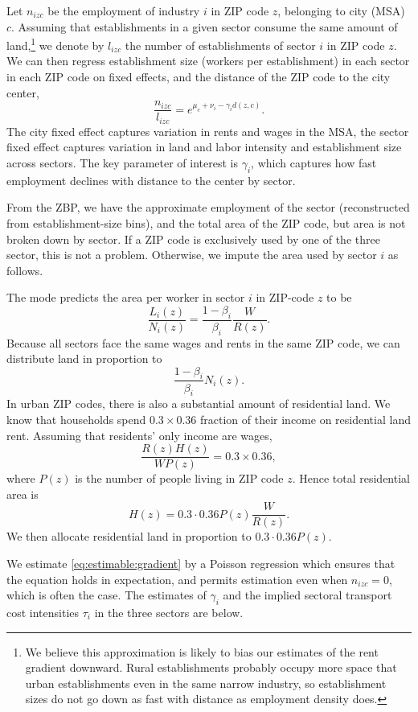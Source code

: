 \documentclass[12pt]{article}
\begin{document}
Let $n_{izc}$ be the employment of industry $i$ in ZIP code $z$, belonging to city (MSA) $c$.  Assuming that establishments in a given sector consume the same amount of land,\footnote{We believe this approximation is likely to bias our estimates of the rent gradient downward. Rural establishments probably occupy more space that urban establishments even in the same narrow industry, so establishment sizes do not go down as fast with distance as employment density does. } we denote by $l_{izc}$ the number of establishments of sector $i$ in ZIP code $z$. We can then regress establishment size (workers per establishment) in each sector in each ZIP code on fixed effects, and the distance of the ZIP code to the city center,
\begin{equation}\label{eq:estimable:gradient}
\frac{n_{izc}}{l_{izc}} = e^{\mu_c+\nu_i-\gamma_i d(z,c)}.
\end{equation}
The city fixed effect captures variation in rents and wages in the MSA, the sector fixed effect captures variation in land and labor intensity and establishment size across sectors. %
The key parameter of interest is $\gamma_i$, which captures how fast employment declines with distance to the center by sector.

From the ZBP, we have the approximate employment of the sector (reconstructed from establishment-size bins), and the total area of the ZIP code, but area is not broken down by sector. If a ZIP code is exclusively used by one of the three sector, this is not a problem. Otherwise, we impute the area used by sector $i$ as follows.

The mode predicts the area per worker in sector $i$ in ZIP-code $z$ to be
\[
\frac{L_i(z)}{N_i(z)} = \frac{1-\beta_i}{\beta_i}\frac{W}{R(z)}.
\]
Because all sectors face the same wages and rents in the same ZIP code, we can distribute land in proportion to
\[
\frac{1-\beta_i}{\beta_i}N_i(z).
\]
In urban ZIP codes, there is also a substantial amount of residential land. We know that households spend $0.3\times 0.36$ fraction of their income on residential land rent. Assuming that residents' only income are wages,
\[
\frac{R(z)H(z)}{WP(z)} = 0.3\times 0.36,
\]
where $P(z)$ is the number of people living in ZIP code $z$. Hence total residential area is
\[
H(z) = 0.3\cdot0.36 P(z) \frac{W}{R(z)}.
\]
We then allocate residential land in proportion to $0.3\cdot0.36 P(z)$.

We estimate \eqref{eq:estimable:gradient} by a Poisson regression which ensures that the equation holds in expectation, and permits estimation even when $n_{izc}=0$, which is often the case. The estimates of $\gamma_i$ and the implied sectoral transport cost intensities $\tau_i$ in the three sectors are below.
\end{document}
